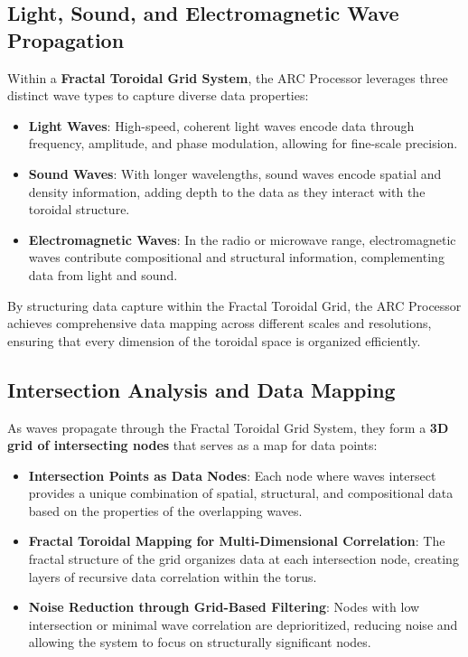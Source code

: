 \documentclass{article}
\begin{document}
\subsection{Light, Sound, and Electromagnetic Wave Propagation}

Within a \textbf{Fractal Toroidal Grid System}, the ARC Processor leverages three distinct wave types to capture diverse data properties:
\begin{itemize}
    \item \textbf{Light Waves}: High-speed, coherent light waves encode data through frequency, amplitude, and phase modulation, allowing for fine-scale precision.
    \item \textbf{Sound Waves}: With longer wavelengths, sound waves encode spatial and density information, adding depth to the data as they interact with the toroidal structure.
    \item \textbf{Electromagnetic Waves}: In the radio or microwave range, electromagnetic waves contribute compositional and structural information, complementing data from light and sound.
\end{itemize}

By structuring data capture within the Fractal Toroidal Grid, the ARC Processor achieves comprehensive data mapping across different scales and resolutions, ensuring that every dimension of the toroidal space is organized efficiently.

\subsection{Intersection Analysis and Data Mapping}

As waves propagate through the Fractal Toroidal Grid System, they form a \textbf{3D grid of intersecting nodes} that serves as a map for data points:
\begin{itemize}
    \item \textbf{Intersection Points as Data Nodes}: Each node where waves intersect provides a unique combination of spatial, structural, and compositional data based on the properties of the overlapping waves.
    \item \textbf{Fractal Toroidal Mapping for Multi-Dimensional Correlation}: The fractal structure of the grid organizes data at each intersection node, creating layers of recursive data correlation within the torus.
    \item \textbf{Noise Reduction through Grid-Based Filtering}: Nodes with low intersection or minimal wave correlation are deprioritized, reducing noise and allowing the system to focus on structurally significant nodes.
\end{itemize}
\end{document}
